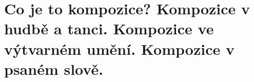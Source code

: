 \section{Co je to kompozice? Kompozice v hudbě a tanci. Kompozice ve výtvarném umění. Kompozice v psaném slově.}